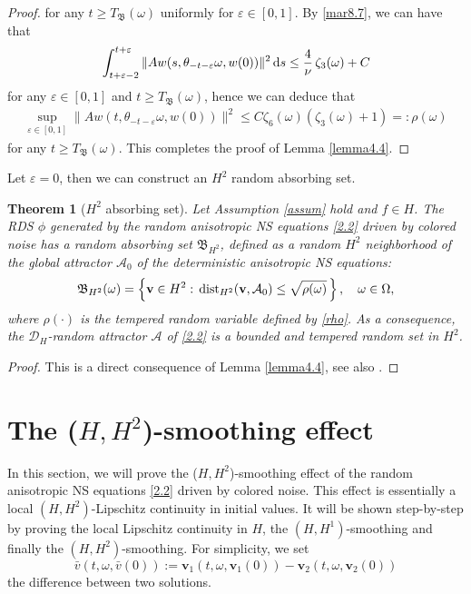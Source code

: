 \documentclass{elsarticle}
\newtheorem{theorem}{Theorem}[section]
\theoremstyle{definition}
\numberwithin{equation}{section}
\renewcommand{\d}{{\rm{d}}}
\begin{document}
\begin{proof}
for any $t\geq T_{\mathfrak B} (\omega)$ uniformly for $\varepsilon\in [0, 1]$.
By  \eqref{mar8.7}, we can have  that
\begin{align*}
 \int_{t+\varepsilon-2}^{t+\varepsilon}   \|Aw(s,\theta_{-t-\varepsilon } \omega, w(0))\|^2 \, \d s \leq \frac 4 \nu \, \zeta_3(\omega) +C
\end{align*}
for any $\varepsilon\in [0,1]$ and $t\geq  T_{\mathfrak B} (\omega) $, hence we can deduce that
\begin{align}\label{rho}
\sup_{\varepsilon\in [0,1]}
  \|Aw(t,\theta_{-t-\varepsilon}\omega, w(0))\|^2     \leq   C \zeta_6(\omega)\left(\zeta_3(\omega) +1\right)=: \rho(\omega)
\end{align}
for any $ t\geq T_{\mathfrak B} (\omega)$. This completes the proof of Lemma \ref{lemma4.4}.
\end{proof}


Let $\varepsilon =0$, then we  can construct an $H^2$ random absorbing set.
\begin{theorem}[$H^2$ absorbing set]
\label{theorem4.1}
 Let Assumption \ref{assum} hold and $f\in H$. The  RDS $\phi$ generated by the random  anisotropic  NS equations \eqref{2.2} driven by colored noise has a  random absorbing set $\mathfrak{B}_{H^2}$, defined as a random $H^2$ neighborhood of the global attractor $\mathcal{A}_0$ of the deterministic anisotropic  NS equations:
\begin{align}
\mathfrak{B}_{H^2}(\omega)=\left \{\textbf{v}\in H^2: \, {\rm dist}_{H^2}(\textbf{v},\mathcal{A}_{0}) \leq \sqrt{\rho(\omega)} \, \right\}, \quad \omega\in\Omega, \nonumber
\end{align}
where $\rho(\cdot)$ is the tempered random variable defined by \eqref{rho}.  As a consequence, the $\mathcal{D}_H$-random attractor $\mathcal{A}$ of \eqref{2.2} is a bounded and tempered random set in $H^2$.

\end{theorem}
\begin{proof}
This is a direct consequence of  Lemma \ref{lemma4.4}, see also   \cite[ Theorem 13]{cui}.\end{proof}

\section{The ($H,H^2$)-smoothing effect} \label{sec5}

In this section, we will prove the ($H,H^2$)-smoothing effect  of the random anisotropic  NS equations \eqref{2.2} driven by colored noise. This effect  is essentially a
local $(H, H^2)$-Lipschitz continuity in initial values. It will be shown  step-by-step by   proving the local Lipschitz continuity in $H$, the  $(H,H^1)$-smoothing and finally the  $(H,H^2)$-smoothing. For simplicity, we set
 $$ \bar v(t,\omega, \bar v(0)):= \textbf{v}_1(t,\omega, \textbf{v}_1(0))-\textbf{v}_2(t,\omega, \textbf{v}_2(0)) $$
the difference between two solutions.
\end{document}
